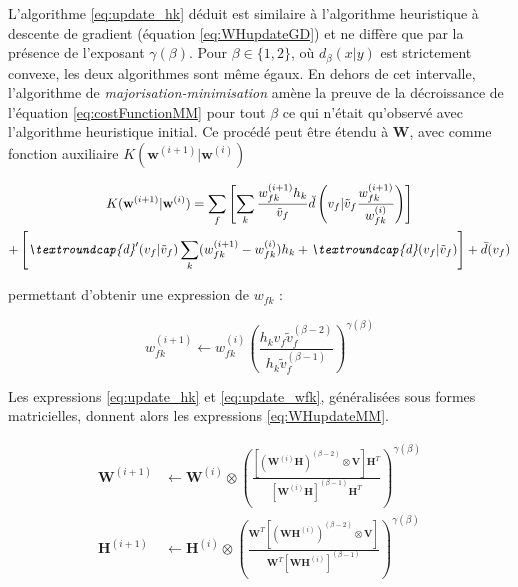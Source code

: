 L'algorithme \ref{eq:update_hk} déduit est similaire à l'algorithme heuristique à descente de gradient (équation \ref{eq:WHupdateGD}) et ne diffère que par la présence de l'exposant $\gamma
(\beta)$. Pour $\beta \in \lbrace 1, 2 \rbrace$, où $d_{\beta}(x\vert y)$ est strictement convexe, les deux algorithmes sont même égaux. En dehors de cet intervalle, l'algorithme de \textit{majorisation-minimisation} amène la preuve de la décroissance de l'équation \ref{eq:costFunctionMM} pour tout $\beta$ ce qui n'était qu'observé avec l'algorithme heuristique initial. Ce procédé peut être étendu à $\mathbf{W}$, avec comme fonction auxiliaire $K(\mathbf{w}^{(i+1)}\vert \mathbf{w}^{(i)})$

\begin{multline}\label{eq:derivé-fonc-auxiliaireK}
K(\mathbf{w}^{(i+1)}\vert \mathbf{w}^{(i)}) =\sum_f \left[ \sum_k \frac{w_{fk}^{(i+1)}h_{k}}{\tilde{v}_f} \breve{d}\left(v_f\vert \tilde{v}_f \frac{w_{fk}^{(i+1)}}{w_{fk}^{(i)}} \right) \right]\\+ \left[ \textit{\textroundcap{d}}'(v_f\vert \tilde{v}_f) \sum_k (w_{fk}^{(i+1)}-w_{fk}^{(i)}) h_k+ \textit{\textroundcap{d}}(v_f\vert \tilde{v}_f)\right] +\bar{d}(v_f)
\end{multline}

permettant d'obtenir une expression de $w_{fk}$ :

\begin{equation}\label{eq:update_wfk}
w_{fk}^{(i+1)} \leftarrow w_{fk}^{(i)}\left( \frac{h_k v_f \tilde{v}_f^{(\beta-2)}}{h_k\tilde{v}_{f}^{(\beta-1)}}\right)^{\gamma(\beta)}
\end{equation} 

Les expressions \ref{eq:update_hk} et \ref{eq:update_wfk}, généralisées sous formes matricielles, donnent alors les expressions \ref{eq:WHupdateMM}. 

\begin{subequations}\label{eq:WHupdateMM}
\begin{align}
\textbf{W}^{(i+1)} &\leftarrow \textbf{W}^{(i)}\otimes\left(\frac{\left[\left(\textbf{W}^{(i)}\mathbf{H} \right)^{(\beta-2)}\otimes\textbf{V} \right]\textbf{H}^T}{\left[\textbf{W}^{(i)}\mathbf{H} \right]^{(\beta-1)}\textbf{H}^T}\right)^{\gamma(\beta)}\label{eq:WupdateMM}\\
\textbf{H}^{(i+1)} &\leftarrow \textbf{H}^{(i)}\otimes\left(\frac{\textbf{W}^T \left[\left(\textbf{WH}^{(i)} \right)^{(\beta-2)}\otimes\textbf{V} \right]}{\textbf{W}^T \left[\textbf{WH}^{(i)} \right]^{(\beta-1)}}\right)^{\gamma(\beta)}\label{eq:HupdateMM}
\end{align}
\end{subequations}


